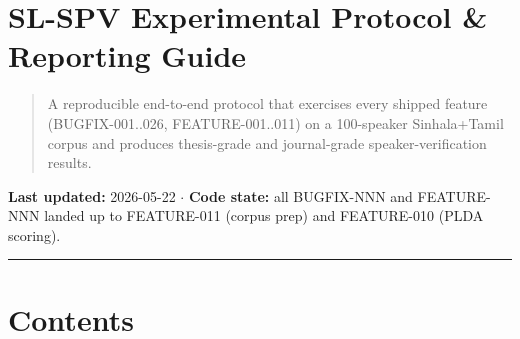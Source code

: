 \documentclass[10pt,a4paper]{article}
\title{}
\author{}
\date{}
\begin{document}
\section*{SL-SPV Experimental Protocol \& Reporting Guide}

\begin{quote}
A reproducible end-to-end protocol that exercises every shipped feature
(BUGFIX-001..026, FEATURE-001..011) on a 100-speaker Sinhala+Tamil corpus
and produces thesis-grade and journal-grade speaker-verification results.
\end{quote}

\textbf{Last updated:} 2026-05-22 $\cdot$ \textbf{Code state:} all BUGFIX-NNN and FEATURE-NNN landed up to FEATURE-011 (corpus prep) and FEATURE-010 (PLDA scoring).

\vspace{0.5em}\hrule\vspace{0.5em}

\section*{Contents}
\end{document}
